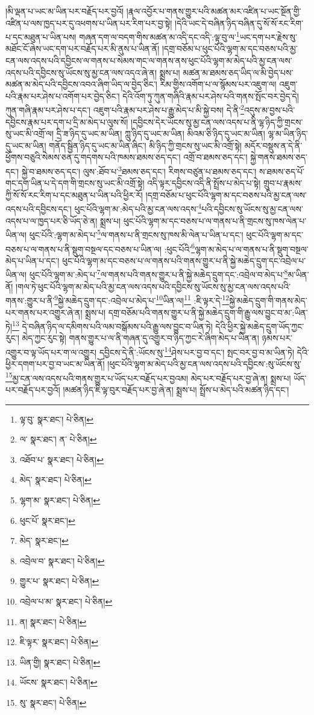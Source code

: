 །མི་ལྡན་པ་ཡང་མ་ཡིན་པར་བརྗོད་པར་བྱའོ། །རྣལ་འབྱོར་པ་གནས་གྱུར་པའི་མཚན་མར་འཛིན་པ་ཡང་སྔོན་གྱི་འཛིན་པ་ལས་ཁྱད་པར་དུ་འཕགས་པ་ཡིན་པར་རིག་པར་བྱ་སྟེ། །དེའི་ཡང་དེ་བཞིན་ཉིད་བཞིན་དུ་སོ་སོ་རང་རིག་པ་དང་མཐུན་པ་ཡིན་པས། གཞན་དག་ལ་བདག་གིས་མཚན་མ་འདི་དང་འདི་:ལྟ་བུ་ལ་\footnote{ལྟ་བུ་  སྣར་ཐང་།  པེ་ཅིན། }ཡང་དག་པར་རྗེས་སུ་མཐོང་ངོ་ཞེས་ཡང་དག་པར་བརྗོད་པར་མི་ནུས་པ་ཡིན་ནོ། །དགྲ་བཅོམ་པ་ཕུང་པོའི་ལྷག་མ་དང་བཅས་པའི་མྱ་ངན་ལས་འདས་པའི་དབྱིངས་ལ་གནས་པ་སེམས་གང་ལ་གནས་ནས་ཕུང་པོའི་ལྷག་མ་མེད་པའི་མྱ་ངན་ལས་འདས་པའི་དབྱིངས་སུ་ཡོངས་སུ་མྱ་ངན་ལས་འདའ་ཞེ་ན། སྨྲས་པ། མཚན་མ་ཐམས་ཅད་ཡིད་ལ་མི་བྱེད་པས་མཚན་མ་མེད་པའི་དབྱིངས་འབའ་ཞིག་ཡིད་ལ་བྱེད་ཅིང་། རིམ་གྱིས་འགོག་པ་ལ་སྙོམས་པར་འཇུག་ལ། འཇུག་པའི་རྣམ་པར་ཤེས་པ་འགོག་པར་བྱེད་ཅིང་། དེའི་འོག་ཏུ་ཀུན་གཞིའི་རྣམ་པར་ཤེས་པའི་གནས་སྤོང་བར་བྱེད་དེ། ཀུན་གཞི་རྣམ་པར་ཤེས་པ་དང་། འཇུག་པའི་རྣམ་པར་ཤེས་པ་རྒྱུ་མེད་པ་མི་སྐྱེ་བས། དེ་ནི་\footnote{ལ་  སྣར་ཐང་། ན་  པེ་ཅིན། }འདུས་མ་བྱས་པའི་དབྱིངས་རྣམ་པར་དག་པ་དྲི་མ་མེད་པ་ལུས་སོ། །དབྱིངས་དེར་ཡོངས་སུ་མྱ་ངན་ལས་འདས་པ་ནི་ལྷ་ཉིད་ཀྱི་གྲངས་སུ་ཡང་མི་འགྲོ་ལ། དྲི་ཟ་ཉིད་དུ་ཡང་མ་ཡིན། ཀླུ་ཉིད་དུ་ཡང་མ་ཡིན། མིའམ་ཅི་ཉིད་དུ་ཡང་མ་ཡིན། ལྷ་མ་ཡིན་ཉིད་དུ་ཡང་མ་ཡིན། གནོད་སྦྱིན་ཉིད་དུ་ཡང་མ་ཡིན་ཞིང་། མི་ཉིད་ཀྱི་གྲངས་སུ་ཡང་མི་འགྲོ་སྟེ། མདོར་བསྡུས་ན་དེ་ནི་ཕྱོགས་བཅུའི་སེམས་ཅན་དུ་གདགས་པའི་ཁམས་ཐམས་ཅད་དང་། འགྲོ་བ་ཐམས་ཅད་དང་། སྐྱེ་གནས་ཐམས་ཅད་དང་། སྐྱེ་བ་ཐམས་ཅད་དང་། ལུས་:ཐོབ་པ་\footnote{འཐོབ་པ་  སྣར་ཐང་།  པེ་ཅིན། }ཐམས་ཅད་དང་། རིགས་བཙུན་པ་ཐམས་ཅད་དང་། ས་ཐམས་ཅད་པོ་གང་དག་ཡིན་པ་དེ་དག་གི་གྲངས་སུ་ཡང་མི་འགྲོ་སྟེ། འདི་ལྟར་དབྱིངས་འདི་ནི་སྤྲོས་པ་མེད་པ་སྟེ། གྲུབ་པ་རྣམས་ཀྱི་སོ་སོ་རང་རིག་པ་དང་མཐུན་པ་ཡིན་པའི་ཕྱིར་རོ། །དགྲ་བཅོམ་པ་ཕུང་པོའི་ལྷག་མ་དང་བཅས་པའི་མྱ་ངན་ལས་འདས་པའི་དབྱིངས་དང་། ཕུང་པོའི་ལྷག་མ་:མེད་པའི་མྱ་ངན་ལས་འདས་\footnote{མེད་  སྣར་ཐང་།  པེ་ཅིན། }པའི་དབྱིངས་སུ་ཡོངས་སུ་མྱ་ངན་ལས་འདས་པ་ལ་ཁྱད་པར་ཅི་ཡོད་ཅེ་ན། སྨྲས་པ། ཕུང་པོའི་ལྷག་མ་དང་བཅས་པ་ལ་གནས་པ་ནི་གྲངས་སུ་ཁས་ལེན་པ་ཡིན་ལ། ཕུང་པོའི་:ལྷག་མ་མེད་པ་\footnote{ལྷག་མ་  སྣར་ཐང་།  པེ་ཅིན། }ལ་གནས་པ་ནི་གྲངས་སུ་ཁས་མི་ལེན་པ་ཡིན་པ་དང་། ཕུང་པོའི་ལྷག་མ་དང་བཅས་པ་ལ་གནས་པ་ནི་སྡུག་བསྔལ་དང་བཅས་པ་ཡིན་ལ། :ཕུང་པོའི་\footnote{ཕུང་པོ་  སྣར་ཐང་། }ལྷག་མ་མེད་པ་ལ་གནས་པ་ནི་སྡུག་བསྔལ་མེད་པ་ཡིན་པ་དང་། ཕུང་པོའི་ལྷག་མ་དང་བཅས་པ་ལ་གནས་པའི་གནས་གྱུར་པ་ནི་སྐྱེ་མཆེད་དྲུག་དང་འབྲེལ་པ་ཡིན་ལ། ཕུང་པོའི་ལྷག་མ་:མེད་པ་\footnote{མེད་  སྣར་ཐང་། }ལ་གནས་པའི་གནས་གྱུར་པ་ནི་སྐྱེ་མཆེད་དྲུག་དང་:འབྲེལ་བ་མེད་པ་\footnote{འབྲེལ་བ་  སྣར་ཐང་།  པེ་ཅིན། }མ་ཡིན་ནོ། །གལ་ཏེ་ཕུང་པོའི་ལྷག་མ་མེད་པའི་མྱ་ངན་ལས་འདས་པའི་དབྱིངས་སུ་ཡོངས་སུ་མྱ་ངན་ལས་འདས་པའི་གནས་:གྱུར་པ་ནི་\footnote{གྱུར་པ་  སྣར་ཐང་།  པེ་ཅིན། }སྐྱེ་མཆེད་དྲུག་དང་:འབྲེལ་པ་མེད་པ་\footnote{འབྲེལ་པ་མ་  སྣར་ཐང་།  པེ་ཅིན། }ཡིན་ལ།\footnote{ན།  སྣར་ཐང་།  པེ་ཅིན། } :ཇི་ལྟར་དེ་\footnote{ཇི་ལྟར་  སྣར་ཐང་།  པེ་ཅིན། }སྐྱེ་མཆེད་དྲུག་གི་གནས་མེད་པར་གནས་པར་འགྱུར་ཞེ་ན། སྨྲས་པ། དགྲ་བཅོམ་པའི་གནས་གྱུར་པ་ནི་སྐྱེ་མཆེད་དྲུག་གི་རྒྱུ་ལས་བྱུང་བ་མ་:ཡིན་ཏེ།\footnote{ཡིན་གྱི།  སྣར་ཐང་།  པེ་ཅིན། } དེ་བཞིན་ཉིད་ལ་དམིགས་པའི་ལམ་བསྒོམས་པའི་རྒྱུ་ལས་བྱུང་བ་ཡིན་ཏེ། དེའི་ཕྱིར་སྐྱེ་མཆེད་དྲུག་ཡོད་ཀྱང་རུང་། མེད་ཀྱང་རུང་སྟེ། གནས་གྱུར་པ་ལ་ནི་གཞན་དུ་འགྱུར་བ་ཉིད་ཀྱང་རེ་ཞིག་མེད་པ་ཡིན་ན། ཉམས་པར་འགྱུར་བ་ལྟ་ཡོད་པར་ག་ལ་འགྱུར། དབྱིངས་དེ་ནི་:ཡོངས་སུ་\footnote{ཡོངས་  སྣར་ཐང་།  པེ་ཅིན། }ཤེས་པར་བྱ་བ་དང་། སྤང་བར་བྱ་བ་མ་ཡིན་ཏེ། དེའི་ཕྱིར་དགག་པར་བྱ་བ་ཡང་མ་ཡིན་ནོ། །ཕུང་པོའི་ལྷག་མ་མེད་པའི་མྱ་ངན་ལས་འདས་པའི་དབྱིངས་:སུ་ཡོངས་སུ་\footnote{སུ་  སྣར་ཐང་།  པེ་ཅིན། }མྱ་ངན་ལས་འདས་པའི་གནས་གྱུར་པ་ཡོད་པར་བརྗོད་པར་བྱའམ། མེད་པར་བརྗོད་པར་བྱ་ཞེ་ན། སྨྲས་པ། ཡོད་པར་བརྗོད་པར་བྱའོ། །མཚན་ཉིད་ཇི་ལྟ་བུར་བརྗོད་པར་བྱ་ཞེ་ན། སྨྲས་པ། སྤྲོས་པ་མེད་པའི་མཚན་ཉིད་དང་། 